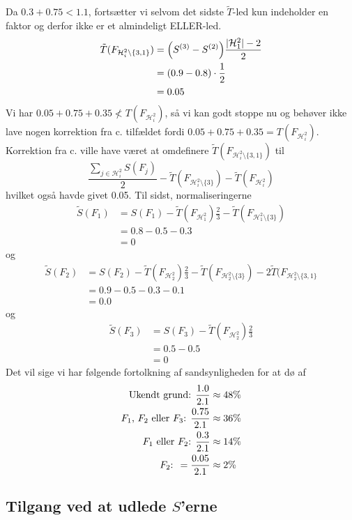 \documentclass[a4paper, 12pt]{memoir}
\begin{document}
Da $0.3+0.75<1.1$, fortsætter vi selvom det sidste \( \tilde T \)-led kun indeholder en faktor og derfor ikke er et almindeligt ELLER-led. 
\begin{align*}
\tilde T(F_{\mathcal H_i^2\setminus\{3,1\}})&=\Bigl(S^{(3)}-S^{(2)}\Bigr)\frac{|\mathcal H_1^2|-2}{2}\\
&=(0.9-0.8)\cdot \frac{1}{2}\\
&=0.05
\end{align*}
Vi har $0.05+0.75+0.35\not<T(F_{\mathcal H_i^2})$, så vi kan godt stoppe nu og behøver ikke lave nogen korrektion fra c. tilfældet fordi $0.05+0.75+0.35=T(F_{\mathcal H_i^2})$. Korrektion fra c. ville have været at omdefinere $\tilde T(F_{\mathcal H_i^2\setminus\{3,1\}})$ til 
\begin{equation*}
\frac{\sum_{j\in \mathcal H_i^2}S(F_j)}{2}-\tilde T(F_{\mathcal H_i^2\setminus\{3\}})-\tilde T(F_{\mathcal H_i^2})
\end{equation*}
hvilket også havde givet 0.05. Til sidst, normaliseringerne
\begin{align*}
\tilde S(F_1)&=S(F_1)-\tilde T(F_{\mathcal H_1^2})\frac{2}{3}- \tilde T(F_{\mathcal H_1^2\setminus\{3\}})\\
&=0.8-0.5-0.3\\
&=0
\end{align*}
og 
\begin{align*}
\tilde S(F_2)&=S(F_2)-\tilde T(F_{\mathcal H_2^2})\frac{2}{3}- \tilde T(F_{\mathcal H_2^2\setminus\{3\}})-2\tilde T(F_{\mathcal H_2^2\setminus\{3,1\}}\\
&=0.9-0.5-0.3-0.1\\
&=0.0
\end{align*}
og
\begin{align*}
\tilde S(F_3)&=S(F_3)-\tilde T(F_{\mathcal H_2^2})\frac{2}{3}\\
&=0.5-0.5\\
&=0
\end{align*}
Det vil sige vi har følgende fortolkning af sandsynligheden for at dø af 
\begin{align}
\textup{Ukendt grund: } \frac{1.0}{2.1}&\approx 48 \%\\
\textup{$F_1$, $F_2$ eller $F_3$: } \frac{0.75}{2.1}&\approx 36 \%\\
\textup{$F_1$ eller $F_2$: } \frac{0.3}{2.1}&\approx 14 \%\\
\textup{$F_2$: }=\frac{0.05}{2.1}&\approx 2 \%
\end{align}

\subsection{Tilgang ved at udlede $S$'erne}
\end{document}
